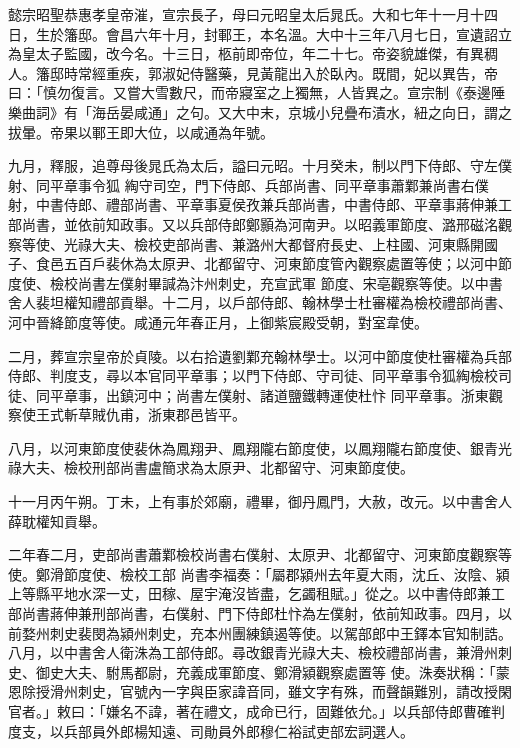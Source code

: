 
\begin{pinyinscope}

 懿宗昭聖恭惠孝皇帝漼，宣宗長子，母曰元昭皇太后晁氏。大和七年十一月十四日，生於籓邸。會昌六年十月，封鄆王，本名溫。大中十三年八月七日，宣遺詔立
 為皇太子監國，改今名。十三日，柩前即帝位，年二十七。帝姿貌雄傑，有異稠人。籓邸時常經重疾，郭淑妃侍醫藥，見黃龍出入於臥內。既間，妃以異告，帝曰：「慎勿復言。又嘗大雪數尺，而帝寢室之上獨無，人皆異之。宣宗制《泰邊陲樂曲詞》有「海岳晏咸通」之句。又大中末，京城小兒疊布漬水，紐之向日，謂之拔暈。帝果以鄆王即大位，以咸通為年號。



 九月，釋服，追尊母後晁氏為太后，謚曰元昭。十月癸未，制以門下侍郎、守左僕射、同平章事令狐
 綯守司空，門下侍郎、兵部尚書、同平章事蕭鄴兼尚書右僕射，中書侍郎、禮部尚書、平章事夏侯孜兼兵部尚書，中書侍郎、平章事蔣伸兼工部尚書，並依前知政事。又以兵部侍郎鄭顥為河南尹。以昭義軍節度、潞邢磁洺觀察等使、光祿大夫、檢校吏部尚書、兼潞州大都督府長史、上柱國、河東縣開國子、食邑五百戶裴休為太原尹、北都留守、河東節度管內觀察處置等使；以河中節度使、檢校尚書左僕射畢諴為汴州刺史，充宣武軍
 節度、宋亳觀察等使。以中書舍人裴坦權知禮部貢舉。十二月，以戶部侍郎、翰林學士杜審權為檢校禮部尚書、河中晉絳節度等使。咸通元年春正月，上御紫宸殿受朝，對室韋使。



 二月，葬宣宗皇帝於貞陵。以右拾遺劉鄴充翰林學士。以河中節度使杜審權為兵部侍郎、判度支，尋以本官同平章事；以門下侍郎、守司徒、同平章事令狐綯檢校司徒、同平章事，出鎮河中；尚書左僕射、諸道鹽鐵轉運使杜忭
 同平章事。浙東觀察使王式斬草賊仇甫，浙東郡邑皆平。



 八月，以河東節度使裴休為鳳翔尹、鳳翔隴右節度使，以鳳翔隴右節度使、銀青光祿大夫、檢校刑部尚書盧簡求為太原尹、北都留守、河東節度使。



 十一月丙午朔。丁未，上有事於郊廟，禮畢，御丹鳳門，大赦，改元。以中書舍人薛耽權知貢舉。



 二年春二月，吏部尚書蕭鄴檢校尚書右僕射、太原尹、北都留守、河東節度觀察等使。鄭滑節度使、檢校工部
 尚書李福奏：「屬郡潁州去年夏大雨，沈丘、汝陰、潁上等縣平地水深一丈，田稼、屋宇淹沒皆盡，乞蠲租賦。」從之。以中書侍郎兼工部尚書蔣伸兼刑部尚書，右僕射、門下侍郎杜忭為左僕射，依前知政事。四月，以前婺州刺史裴閔為潁州刺史，充本州團練鎮遏等使。以駕部郎中王鐸本官知制誥。八月，以中書舍人衛洙為工部侍郎。尋改銀青光祿大夫、檢校禮部尚書，兼滑州刺史、御史大夫、駙馬都尉，充義成軍節度、鄭滑潁觀察處置等
 使。洙奏狀稱：「蒙恩除授滑州刺史，官號內一字與臣家諱音同，雖文字有殊，而聲韻難別，請改授閑官者。」敕曰：「嫌名不諱，著在禮文，成命已行，固難依允。」以兵部侍郎曹確判度支，以兵部員外郎楊知遠、司勛員外郎穆仁裕試吏部宏詞選人。




\end{pinyinscope}
